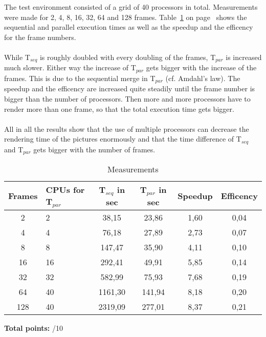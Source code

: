 \documentclass{article}
\begin{document}
The test environment consisted of a grid of 40 processors in total. Measurements were made for 2, 4, 8, 16, 32, 64 and 128 frames. Table~\ref{tab:measurements} on page~\pageref{tab:measurements} shows the sequential and parallel execution times as well as the speedup and the efficency for the frame numbers.
\\
\\
While T$_{seq}$ is roughly doubled with every doubling of the frames, T$_{par}$ is increased much slower. Either way the increase of T$_{par}$ gets bigger with the increase of the frames. This is due to the sequential merge in T$_{par}$ (cf. Amdahl's law). The speedup and the efficency are increased quite steadily until the frame number is bigger than the number of processors. Then more and more processors have to render more than one frame, so that the total execution time gets bigger.
\\
\\
All in all the results show that the use of multiple processors can decrease the rendering time of the pictures enormously and that the time difference of T$_{seq}$ and T$_{par}$ gets bigger with the number of frames.  

\begin{table}[htbp]
\centering
\begin{tabular}{ | c | p{1cm} | c | c | c | c |}
\hline
\textbf{Frames} & \textbf{CPUs for T$_{par}$} & \textbf{T$_{seq}$ in sec} & \textbf{T$_{par}$ in sec} & \textbf{Speedup} & \textbf{Efficency} \\
\hline \hline
2 & 2 & 38,15 & 23,86 & 1,60 & 0,04 \\
\hline
4 & 4 & 76,18 & 27,89 & 2,73 & 0,07 \\
\hline
8 & 8 & 147,47 & 35,90 & 4,11 & 0,10 \\
\hline
16 & 16 & 292,41 & 49,91 & 5,85 & 0,14 \\
\hline
32 & 32 & 582,99 & 75,93 & 7,68 & 0,19 \\
\hline
64 & 40 & 1161,30 & 141,94 & 8,18 & 0,20 \\
\hline
128 & 40 & 2319,09 & 277,01 & 8,37 & 0,21 \\
\hline
\end{tabular}
\caption{Measurements}
\label{tab:measurements}
\end{table}

\vfill
\textbf{Total points:} \hspace{1em} /10

\end{document}
